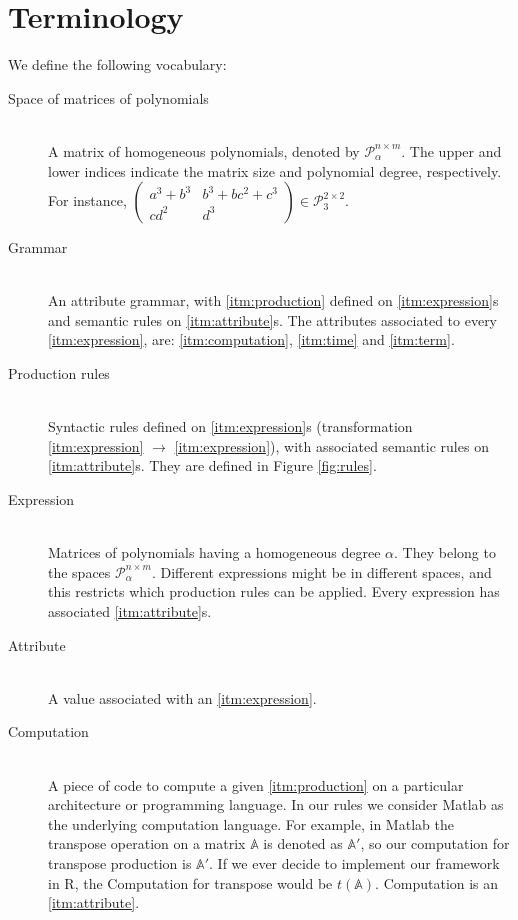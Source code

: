 \section{Terminology}
We define the following vocabulary: 
\vspace{-2mm}
\begin{description}
  \item[Space of matrices of polynomials\label{itm:spacematrices}] \hfill \\ A matrix of homogeneous polynomials, denoted by $\mathcal{P}^{n \times m}_{\alpha}$. The upper and lower indices indicate the matrix size and polynomial degree, respectively. For instance, $\begin{pmatrix} a^3 + b^3 & b^3 + bc^2 + c^3\\ cd^2 & d^3 \end{pmatrix} \in \mathcal{P}^{2 \times 2}_3$. 

\item[Grammar\label{itm:grammar}] \hfill \\ An attribute grammar, with \ref{itm:production} defined on \ref{itm:expression}s and semantic rules on \ref{itm:attribute}s. The attributes associated to every \ref{itm:expression}, are: \ref{itm:computation}, \ref{itm:time} and \ref{itm:term}.

\item[Production rules\label{itm:production}] \hfill \\ Syntactic rules defined on \ref{itm:expression}s (transformation \ref{itm:expression} $\rightarrow$ \ref{itm:expression}), with associated semantic rules on \ref{itm:attribute}s. They are defined in Figure \ref{fig:rules}.

\item[Expression\label{itm:expression}] \hfill \\ Matrices of polynomials having a homogeneous degree $\alpha$. They belong to the spaces $\mathcal{P}^{n \times m}_\alpha$. Different expressions might be in different spaces, and this restricts which production rules can be applied. Every expression has associated \ref{itm:attribute}s.

\item[Attribute\label{itm:attribute}] \hfill \\
  A value associated with an \ref{itm:expression}. 

\item[Computation\label{itm:computation}] \hfill \\ A piece of code to compute a given \ref{itm:production} on a particular architecture or programming language. In our rules we consider Matlab as
the underlying computation language. For example, in Matlab the transpose
  operation on a matrix $\mathbb{A}$ is denoted as $\mathbb{A}'$, so our computation
  for transpose production is $\mathbb{A}'$. If we ever decide to implement our framework in R,
  the Computation for transpose would be $t(\mathbb{A})$. Computation is an \ref{itm:attribute}.


\end{description}
